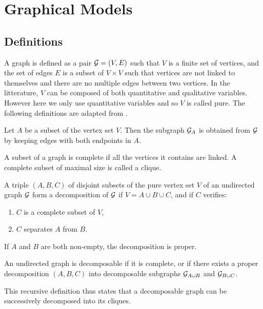  \section{Graphical Models}
 
 \subsection{Definitions}
 A graph is defined as a pair $\mathcal{G}=(V,E)$ such that $V$ is a finite set of vertices, and the set of edges $E$ is a subset of $V\times V$ such that vertices are not linked to themselves and there are no multiple edges between two vertices. In the litterature, $V$ can be composed of both quantitative and qualitative variables. However here we  only use quantitative variables and so $V$ is called pure. The following definitions are adapted from \citet{Lau96}.
 \begin{definition}[Subgraphs]
 Let $A$ be a subset of the vertex set $V$. Then the subgraph $\mathcal{G}_A$ is obtained from $\mathcal{G}$ by keeping edges with both endpoints in $A$.
 \end{definition}
 
 \begin{definition}
 A subset of a graph is complete if all the vertices it contains are linked. A complete subset of maximal size is called a clique.
 \end{definition}
 
 \begin{definition}
 A triple $(A, B, C)$ of disjoint subsets of the pure vertex set $V$ of an undirected graph $\mathcal{G}$ form a decomposition of $\mathcal{G}$ if $V=A\cup B \cup C$, and if $C$ verifies:
 \begin{enumerate}[label=(\roman*)]
 \item $C$ is a complete subset of  $V$,
 \item $C$ separates $A$ from $B$.
 \end{enumerate}
 If $A$ and $B$ are both non-empty, the decomposition is proper.
 \end{definition}
 
 \begin{definition}
 An undirected graph is decomposable if it is complete, or if there exists a proper decomposition $(A, B, C)$ into decomposable subgraphs $\mathcal{G}_{A\cup B}$ and $\mathcal{G}_{B\cup C}$.
 \end{definition}
 This recursive definition thus states that a decomposable graph can be successively decomposed into its cliques.
 

